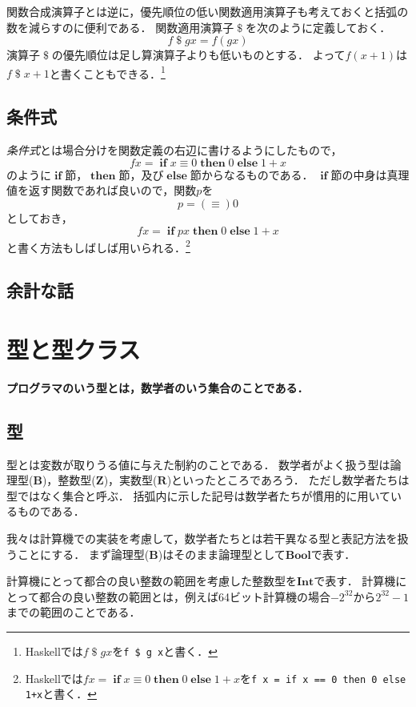 \documentclass[twocolumn]{jsbook}
\newcommand{\hsklType}[1]{\textbf{#1}}
\newcommand{\hsklBool}{\hsklType{Bool}}
\newcommand{\hsklInt}{\hsklType{Int}}
\newcommand{\mathKeyword}[1]{\mathbf{#1}}
\DeclareMathOperator{\mathApply}{\$}
\DeclareMathOperator{\mathElse}{\mathKeyword{else}}
\DeclareMathOperator{\mathIf}{\mathKeyword{if}}
\DeclareMathOperator{\mathThen}{\mathKeyword{then}}
\newcommand{\mathSet}[1]{\mathbf{#1}}
\newcommand{\keyword}[1]{\emph{#1}}
\newcommand{\code}[1]{\texttt{#1}}
\newenvironment{leader}{\begingroup\bf}{\endgroup}
\newcommand{\binaryeq}{\equiv}
\newcommand{\keywordname}[1]{\mathbf{#1}}
\newcommand{\keywordif}{\mathop{\keywordname{if}}}
\newcommand{\keywordthen}{\mathop{\keywordname{then}}}
\newcommand{\keywordelse}{\mathop{\keywordname{else}}}
\begin{document}
関数合成演算子とは逆に，優先順位の低い関数適用演算子も考えておくと括弧の数を減らすのに便利である．
関数適用演算子$\mathApply$を次のように定義しておく．
$$f\mathApply gx=f(gx)$$
演算子$\mathApply$の優先順位は足し算演算子よりも低いものとする．
よって$f(x+1)$は$f\mathApply x+1$と書くこともできる．\footnote{Haskellでは$f\mathApply gx$を\code{f \$ g x}と書く．}

\section{条件式}

\keyword{条件式}とは場合分けを関数定義の右辺に書けるようにしたもので，
$$fx=\mathIf x\equiv0\mathThen0\mathElse1+x$$
のように$\mathIf$節，$\mathThen$節，及び$\mathElse$節からなるものである．
$\mathIf$節の中身は真理値を返す関数であれば良いので，関数$p$を$$p=(\equiv)0$$としておき，$$fx=\mathIf px\mathThen0\mathElse1+x$$と書く方法もしばしば用いられる．\footnote{Haskellでは$fx=\keywordif x\binaryeq0\keywordthen0\keywordelse1+x$を\code{f x = if x == 0 then 0 else 1+x}と書く．}

\section*{余計な話}

\chapter{型と型クラス}

\begin{leader}
プログラマのいう型とは，数学者のいう集合のことである．
\end{leader}


\section{型}

型とは変数が取りうる値に与えた制約のことである．
数学者がよく扱う型は論理型($\mathSet{B}$)，整数型($\mathSet{Z}$)，実数型($\mathSet{R}$)といったところであろう．
ただし数学者たちは型ではなく集合と呼ぶ．
括弧内に示した記号は数学者たちが慣用的に用いているものである．

我々は計算機での実装を考慮して，数学者たちとは若干異なる型と表記方法を扱うことにする．
まず論理型($\mathSet{B}$)はそのまま論理型として$\hsklBool$で表す．

計算機にとって都合の良い整数の範囲を考慮した整数型を$\hsklInt$で表す．
計算機にとって都合の良い整数の範囲とは，例えば64ビット計算機の場合$-2^{32}$から$2^{32}-1$までの範囲のことである．
\end{document}
